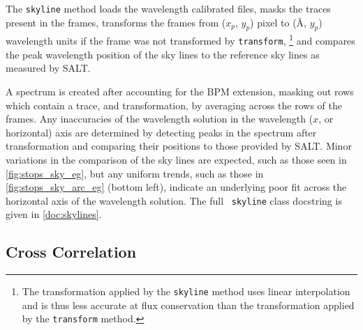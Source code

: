 \pagebreak

The \texttt{skyline} method loads the wavelength calibrated files, masks the traces present in the frames, transforms the frames from ($x_p$, $y_p$) pixel to (\AA, $y_p$) wavelength units if the frame was not transformed by \texttt{transform},%
\footnote{The transformation applied by the \texttt{skyline} method uses linear interpolation and is thus less accurate at flux conservation than the transformation applied by the \texttt{transform} method.}
and compares the peak wavelength position of the sky lines to the reference sky lines as measured by \gls{SALT}.

A spectrum is created after accounting for the \gls{BPM} extension, masking out rows which contain a trace, and transformation, by averaging across the rows of the frames.
Any inaccuracies of the wavelength solution in the wavelength ($x$, or horizontal) axis are determined by detecting peaks in the spectrum after transformation and comparing their positions to those provided by \gls{SALT}. Minor variations in the comparison of the sky lines are expected, such as those seen in \autoref{fig:stops_sky_eg}, but any uniform trends, such as those in \autoref{fig:stops_sky_arc_eg} (bottom left), indicate an underlying poor fit across the horizontal axis of the wavelength solution.
% 
The full \stops\ \texttt{skyline} class docstring is given in \autoref{doc:skylines}.

\subsection{Cross Correlation} \label{subsec:stops_correlate}

